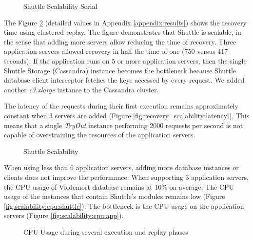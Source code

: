 \begin{figure}[!htb] 
    \centering
    \resizebox{0.6\linewidth}{!}{}
    \caption{Shuttle Scalability Serial}
    \label{fig:scalability:serial}
\end{figure}


The Figure \ref{fig:scalability} (detailed values in Appendix \ref{appendix:results}) shows the recovery time using clustered replay. The figure demonstrates that Shuttle is scalable, in the sense that adding more servers allow reducing the time of recovery. Three application servers allowed recovery in half the time of one (750 versus 417 seconds). If the application runs on 5 or more application servers, then the single Shuttle Storage (Cassandra) instance becomes the bottleneck because Shuttle database client interceptor fetches the keys accessed by every request. We added another \emph{c3.xlarge} instance to the Cassandra cluster. 

The latency of the requests during their first execution remains approximately constant when 3 servers are added (Figure \ref{fig:recovery_scalability:latency}). This means that a single \emph{TryOut} instance performing 2000 requests per second is not capable of overstraining the resources of the application servers.

\begin{figure}[!htb]
  \centering
  \caption{Shuttle Scalability}
  \label{fig:scalability}
\end{figure}

When using less than 6 application servers, adding more database instances or clients does not improve the performance. When supporting 3 application servers, the \ac{CPU} usage of Voldemort database remains at 10\% on average. The \ac{CPU} usage of the instances that contain Shuttle's modules remains low (Figure \ref{fig:scalability:cpu:shuttle}). The bottleneck is the \ac{CPU} usage on the application servers (Figure \ref{fig:scalability:cpu:app}).

\begin{figure}[!htb]
  \centering
  \caption{CPU Usage during several execution and replay phases}
  \label{fig:scalability:cpu}
\end{figure}

